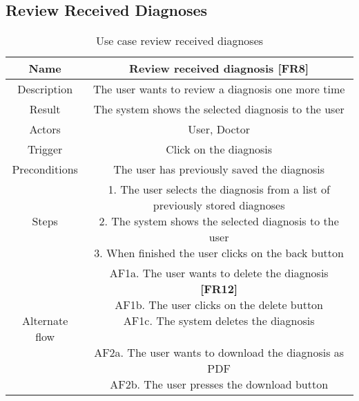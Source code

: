 \subsection{Review Received Diagnoses}
\begin{table}[H]
	\begin{center}\scriptsize
		\def\arraystretch{2}%
		\begin{tabular}{ |c|c| } 
			\hline
			Name & Review received diagnosis \textbf{[FR8]}\\
			\hline	
			Description & The user wants to review a diagnosis one more time \\ 
			\hline
			Result & The system shows the selected diagnosis to the user\\ 
			\hline
			Actors & User, Doctor \\ 
			\hline
			Trigger & Click on the diagnosis \\ 
			\hline
			Preconditions & The user has previously saved the diagnosis \\ 
			\hline
			Steps & \parbox{9cm}{\vspace{.5\baselineskip}1. The user selects the diagnosis from a list of previously stored diagnoses\\2. The system shows the selected diagnosis to the user \\ 3. When finished the user clicks on the back button}\\
			\hline
			Alternate flow & \parbox{9cm}{\vspace{.5\baselineskip}
				AF1a. The user wants to delete the diagnosis \textbf{[FR12]}\\
				AF1b. The user clicks on the delete button\\
				AF1c. The system deletes the diagnosis\\\\
				AF2a. The user wants to download the diagnosis as PDF\\
				AF2b. The user presses the download button}\\
			\hline
		\end{tabular}\normalsize
	\end{center}
	\caption{Use case review received diagnoses}
\end{table}

